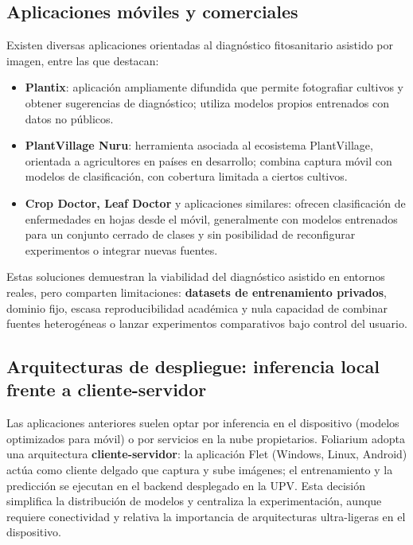 \documentclass[11pt,spanish,listoffigures,listoftables]{tfgetsinf}
\begin{document}
\subsection{Aplicaciones móviles y comerciales}

Existen diversas aplicaciones orientadas al diagnóstico fitosanitario asistido por imagen, entre las que destacan:

\begin{itemize}
    \item \textbf{Plantix}: aplicación ampliamente difundida que permite fotografiar cultivos y obtener sugerencias de diagnóstico; utiliza modelos propios entrenados con datos no públicos.
    \item \textbf{PlantVillage Nuru}: herramienta asociada al ecosistema PlantVillage, orientada a agricultores en países en desarrollo; combina captura móvil con modelos de clasificación, con cobertura limitada a ciertos cultivos.
    \item \textbf{Crop Doctor, Leaf Doctor} y aplicaciones similares: ofrecen clasificación de enfermedades en hojas desde el móvil, generalmente con modelos entrenados para un conjunto cerrado de clases y sin posibilidad de reconfigurar experimentos o integrar nuevas fuentes.
\end{itemize}

Estas soluciones demuestran la viabilidad del diagnóstico asistido en entornos reales, pero comparten limitaciones: \textbf{datasets de entrenamiento privados}, dominio fijo, escasa reproducibilidad académica y nula capacidad de combinar fuentes heterogéneas o lanzar experimentos comparativos bajo control del usuario.

\subsection{Arquitecturas de despliegue: inferencia local frente a cliente-servidor}

Las aplicaciones anteriores suelen optar por inferencia en el dispositivo (modelos optimizados para móvil) o por servicios en la nube propietarios. Foliarium adopta una arquitectura \textbf{cliente-servidor}: la aplicación Flet (Windows, Linux, Android) actúa como cliente delgado que captura y sube imágenes; el entrenamiento y la predicción se ejecutan en el backend desplegado en la UPV. Esta decisión simplifica la distribución de modelos y centraliza la experimentación, aunque requiere conectividad y relativa la importancia de arquitecturas ultra-ligeras en el dispositivo.
\end{document}
